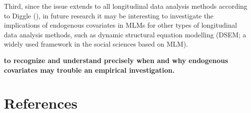 \documentclass[
  11pt,
  a4paper,
]{article}
\begin{document}
Third, since the issue extends to all longitudinal data analysis methods
according to Diggle (), in future
research it may be interesting to investigate the implications of
endogenous covariates in MLMs for other types of longitudinal data
analysis methods, such as dynamic structural equation modelling (DSEM; a
widely used framework in the social sciences based on MLM).

\textbf{to recognize and understand precisely when and why endogenous
covariates may trouble an empirical investigation.}

\newpage

\section{References}\label{references}
\end{document}
